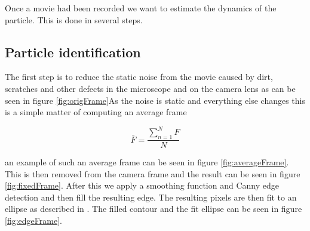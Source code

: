 Once a movie had been recorded we want to estimate the dynamics of the particle. This is done in several steps. 

\subsection{Particle identification}

The first step is to reduce the static noise from the movie caused by dirt, scratches and other defects in the microscope and on the camera lens as can be seen in figure \ref{fig:origFrame}As the noise is static and everything else changes this is a simple matter of computing an average frame

\begin{equation}\label{eq:averageFrame}
\bar{F} = \frac{\sum\limits_{n=1}^{N} F }{N}
\end{equation}

an example of such an average frame can be seen in figure \ref{fig:averageFrame}. This is then removed from the camera 
frame and the result can be seen in figure \ref{fig:fixedFrame}. After this we apply a smoothing function and Canny 
edge detection \cite{Canny} and then fill the resulting edge. The resulting pixels are then fit to an ellipse as 
described in \cite{AntonThesis, EllipseFit}. The filled contour and the fit ellipse can be seen in figure 
\ref{fig:edgeFrame}.

